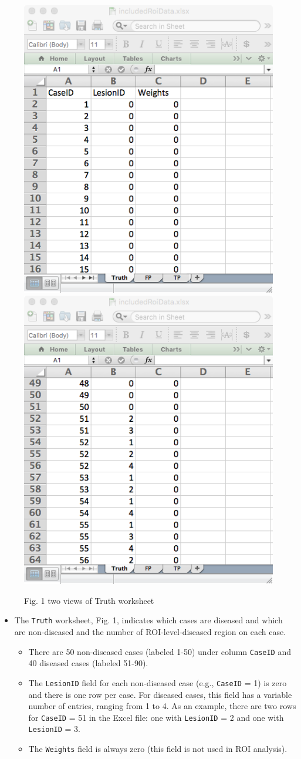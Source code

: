 \documentclass[
]{book}
\providecommand{\tightlist}{%
  \setlength{\itemsep}{0pt}\setlength{\parskip}{0pt}}
\begin{document}
\begin{figure}

{\centering \includegraphics[width=0.5\linewidth,height=0.2\textheight]{images/ROI-Truth-1} \includegraphics[width=0.5\linewidth,height=0.2\textheight]{images/ROI-Truth-2} 

}

\caption{Fig. 1 two views of Truth worksheet}\label{fig:unnamed-chunk-3}
\end{figure}

\begin{itemize}
\tightlist
\item
  The \texttt{Truth} worksheet, Fig. 1, indicates which cases are diseased and which are non-diseased and the number of ROI-level-diseased region on each case.

  \begin{itemize}
  \tightlist
  \item
    There are 50 non-diseased cases (labeled 1-50) under column \texttt{CaseID} and 40 diseased cases (labeled 51-90).\\
  \item
    The \texttt{LesionID} field for each non-diseased case (e.g., \texttt{CaseID} = 1) is zero and there is one row per case. For diseased cases, this field has a variable number of entries, ranging from 1 to 4. As an example, there are two rows for \texttt{CaseID} = 51 in the Excel file: one with \texttt{LesionID} = 2 and one with \texttt{LesionID} = 3.\\
  \item
    The \texttt{Weights} field is always zero (this field is not used in ROI analysis).
  \end{itemize}
\end{itemize}
\end{document}
